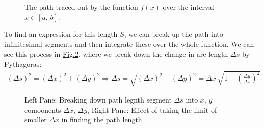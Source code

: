 \documentclass[letterpaper,10pt,english]{jupyterBook}
\begin{document}
\begin{figure}[htbp]
\centering
\capstart

\noindent{}
\caption{The path traced out by the function \(f(x)\) over the interval \(x \in [a,\,b]\).}\label{\detokenize{VectorCalculus/integrationprelim:functionpathlength}}\end{figure}

\sphinxAtStartPar
To find an expression for this length \(S\), we can break up the path into infinitesimal segments and then integrate these over the whole function.  We can see this
process in \hyperref[\detokenize{VectorCalculus/integrationprelim:arclength}]{Fig.\@ \ref{\detokenize{VectorCalculus/integrationprelim:arclength}}}, where we break down the change in arc length \(\Delta s\) by Pythagoras:
\begin{equation*}
\begin{split}(\Delta s)^2 = (\Delta x)^2 + (\Delta y)^2 \Rightarrow \Delta s = \sqrt{(\Delta x)^2 + (\Delta y)^2} = \Delta x\,\sqrt{1 + \left(\frac{\Delta y}{\Delta x}\right)^2}\end{split}
\end{equation*}
\begin{figure}[htbp]
\centering
\capstart

\noindent{}
\caption{Left Pane: Breaking down path legnth segment \(\Delta s\) into \(x,\, y\) comoonents \(\Delta x,\, \Delta y\),
Right Pane: Effect of taking the limit of smaller \(\Delta x\) in finding the path length.}\label{\detokenize{VectorCalculus/integrationprelim:arclength}}\end{figure}
\end{document}
